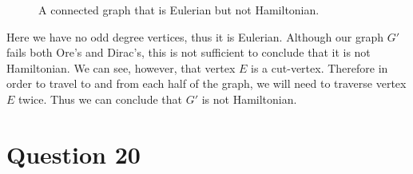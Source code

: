 \documentclass[11pt, oneside]{article}   	%
\begin{document}
\begin{enumerate}[\quad (a)]
\begin{figure}[h]
            
            \caption{A connected graph that is Eulerian but not Hamiltonian.}
            \label{E not H}
          \end{figure}

	Here we have no odd degree vertices, thus it is Eulerian. Although our graph $G'$ fails both Ore's and Dirac's, this is not sufficient to conclude that it is not Hamiltonian. We can see, however, that vertex $E$ is a cut-vertex. Therefore in order to travel to and from each half of the graph, we will need to traverse vertex $E$ twice. Thus we can conclude that $G'$ is not Hamiltonian.

\end{enumerate} 


\section*{Question 20}
\end{document}
